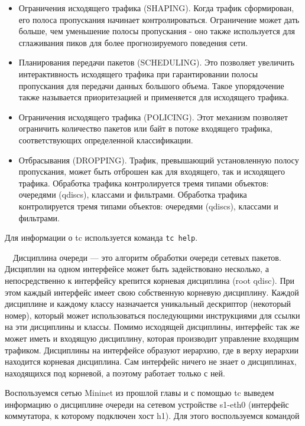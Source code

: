\documentclass[
  13pt,
  fontsize=13pt,
  russian,
  a4paper,
,captions=tableheading
]{scrreprt}
\providecommand{\tightlist}{%
  \setlength{\itemsep}{0pt}\setlength{\parskip}{0pt}}
\begin{document}
\begin{itemize}
\tightlist
\item
  Ограничения исходящего трафика (SHAPING). Когда трафик сформирован,
  его полоса пропускания начинает контролироваться. Ограничение может
  дать больше, чем уменьшение полосы пропускания - оно также
  используется для сглаживания пиков для более прогнозируемого поведения
  сети.
\item
  Планирования передачи пакетов (SCHEDULING). Это позволяет увеличить
  интерактивность исходящего трафика при гарантировании полосы
  пропускания для передачи данных большого объема. Такое упорядочение
  также называется приоритезацией и применяется для исходящего трафика.
\item
  Ограничения исходящего трафика (POLICING). Этот механизм позволяет
  ограничить количество пакетов или байт в потоке входящего трафика,
  соответствующих определенной классификации.
\item
  Отбрасывания (DROPPING). Трафик, превышающий установленную полосу
  пропускания, может быть отброшен как для входящего, так и исходящего
  трафика. Обработка трафика контролируется тремя типами объектов:
  очередями (qdiscs), классами и фильтрами. Обработка трафика
  контролируется тремя типами объектов: очередями (qdiscs), классами и
  фильтрами.
\end{itemize}

Для информации о tc используется команда \texttt{tc help}.

\(\quad\)Дисциплина очереди --- это алгоритм обработки очереди сетевых
пакетов. Дисциплин на одном интерфейсе может быть задействовано
несколько, а непосредственно к интерфейсу крепится корневая дисциплина
(root qdisc). При этом каждый интерфейс имеет свою собственную корневую
дисциплину. Каждой дисциплине и каждому классу назначается уникальный
дескриптор (некоторый номер), который может использоваться последующими
инструкциями для ссылки на эти дисциплины и классы. Помимо исходящей
дисциплины, интерфейс так же может иметь и входящую дисциплину, которая
производит управление входящим трафиком. Дисциплины на интерфейсе
образуют иерархию, где в верху иерархии находится корневая дисциплина.
Сам интерфейс ничего не знает о дисциплинах, находящихся под корневой, а
поэтому работает только с ней.

Воспользуемся сетью Mininet из прошлой главы и с помощью tc выведем
информацию о дисциплине очереди на сетевом устройстве s1-eth0 (интерфейс
коммутатора, к которому подключен хост h1). Для этого воспользуемся
командой
\end{document}
